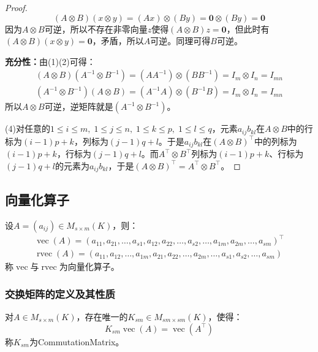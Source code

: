 \begin{proof}
\begin{equation*}
		(A\otimes B)(x\otimes y)=(Ax)\otimes(By)=\mathbf{0}\otimes(By)=\mathbf{0}
	\end{equation*}
	因为$A\otimes B$可逆，所以不存在非零向量$z$使得$(A\otimes B)z=\mathbf{0}$，但此时有$(A\otimes B)(x\otimes y)=\mathbf{0}$，矛盾，所以$A$可逆。同理可得$B$可逆。\par
	\textbf{充分性：}由(1)(2)可得：
	\begin{gather*}
		(A\otimes B)(A^{-1}\otimes B^{-1})=(AA^{-1})\otimes(BB^{-1})=I_m\otimes I_n=I_{mn} \\
		(A^{-1}\otimes B^{-1})(A\otimes B)=(A^{-1}A)\otimes(B^{-1}B)=I_m\otimes I_n=I_{mn}
	\end{gather*}
	所以$A\otimes B$可逆，逆矩阵就是$(A^{-1}\otimes B^{-1})$。\par
	(4)对任意的$1\leqslant i\leqslant m,\;1\leqslant j\leqslant n,\;1\leqslant k\leqslant p,\;1\leqslant l\leqslant q$，元素$a_{ij}b_{kl}$在$A\otimes B$中的行标为$(i-1)p+k$，列标为$(j-1)q+l$。于是$a_{ij}b_{kl}$在$(A\otimes B)^{\top}$中的列标为$(i-1)p+k$，行标为$(j-1)q+l$。而$A^{\top}\otimes B^{\top}$列标为$(i-1)p+k$、行标为$(j-1)q+l$的元素为$a_{ij}b_{kl}$，于是$(A\otimes B)^{\top}=A^{\top}\otimes B^{\top}$。
\end{proof}
\subsection{向量化算子}
\begin{definition}
	设$A=(a_{ij})\in M_{s\times m}(K)$，则：
	\begin{gather*}
		\operatorname{vec}(A)=(a_{11},a_{21},\dots,a_{s1},a_{12},a_{22},\dots,a_{s2},\dots,a_{1m},a_{2m},\dots,a_{sm})^{\top} \\
		\operatorname{rvec}(A)=(a_{11},a_{12},\dots,a_{1m},a_{21},a_{22},\dots,a_{2m},\dots,a_{s1},a_{s2},\dots,a_{sm})
	\end{gather*}
	称$\operatorname{vec}$与$\operatorname{rvec}$为向量化算子。
\end{definition}
\subsubsection{交换矩阵的定义及其性质}
\begin{definition}
	对$A\in M_{s\times m}(K)$，存在唯一的$K_{sm}\in M_{sm\times sm}(K)$，使得：
	\begin{equation*}
		K_{sm}\operatorname{vec}(A)=\operatorname{vec}(A^{\top})
	\end{equation*}
	称$K_{sm}$为\gls{CommutationMatrix}。
\end{definition}
